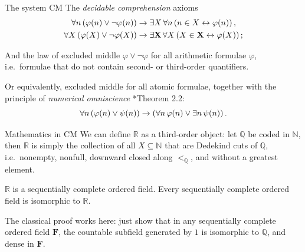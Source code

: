 \documentclass{beamer}
\begin{document}
\begin{frame}{The system $\mathrm{CM}$}
  The \emph{decidable comprehension} axioms
  \begin{align*}
    \forall n \left(\varphi\mleft(n\mright) \lor \neg \varphi\mleft(n\mright)\right) & \rightarrow \exists X \, \forall n \left(n \in X \leftrightarrow \varphi\mleft(n\mright)\right),                   \\
    \forall X \left(\varphi\mleft(X\mright) \lor \neg \varphi\mleft(X\mright)\right) & \rightarrow \exists \mathbf{X} \, \forall X \left(X \in \mathbf{X} \leftrightarrow \varphi\mleft(X\mright)\right);
  \end{align*}

  And the law of excluded middle $\varphi \lor \neg \varphi$ for all arithmetic formulae $\varphi$, i.e.\ formulae that do not contain second- or third-order quantifiers.

  \vspace{0.6em}

  Or equivalently, excluded middle for all atomic formulae, together with the principle of \emph{numerical omniscience} \cite{weaver09-cm}*{Theorem 2.2}:
  \[\forall n \left(\varphi\mleft(n\mright) \lor \psi\mleft(n\mright)\right) \rightarrow \left(\forall n \, \varphi\mleft(n\mright) \lor \exists n \, \psi\mleft(n\mright)\right).\]
\end{frame}

\begin{frame}{Mathematics in $\mathrm{CM}$}
  We can define $\mathbb{R}$ as a third-order object: let $\mathbb{Q}$ be coded in $\mathbb{N}$, then $\mathbb{R}$ is simply the collection of all $X \subseteq \mathbb{N}$ that are Dedekind cuts of $\mathbb{Q}$, i.e.\ nonempty, nonfull, downward closed along $<_\mathbb{Q}$, and without a greatest element.

  \vspace{0.6em}

  \begin{theorem}
    $\mathbb{R}$ is a sequentially complete ordered field. Every sequentially complete ordered field is isomorphic to $\mathbb{R}$.
  \end{theorem}

  The classical proof works here: just show that in any sequentially complete ordered field $\mathbf{F}$, the countable subfield generated by $1$ is isomorphic to $\mathbb{Q}$, and dense in $\mathbf{F}$.
\end{frame}
\end{document}

